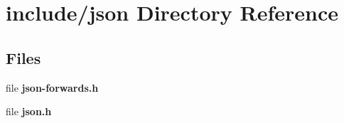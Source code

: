 \section{include/json Directory Reference}
\label{dir_afd937d70611a55c9601734fb033a9b9}
\subsection*{Files}
\begin{DoxyCompactItemize}
\item 
file {\bfseries json-\/forwards.\+h}
\item 
file {\bfseries json.\+h}
\end{DoxyCompactItemize}
